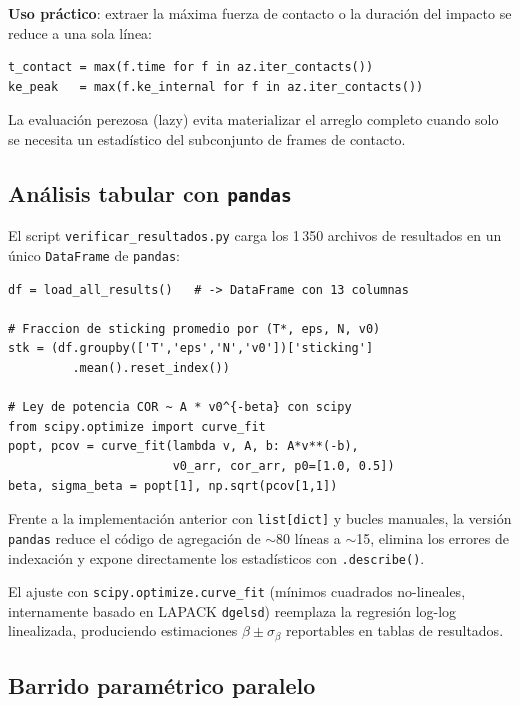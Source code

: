 \textbf{Uso práctico}: extraer la máxima fuerza de contacto o la duración
del impacto se reduce a una sola línea:
\begin{lstlisting}
t_contact = max(f.time for f in az.iter_contacts())
ke_peak   = max(f.ke_internal for f in az.iter_contacts())
\end{lstlisting}

La evaluación perezosa (lazy) evita materializar el arreglo completo cuando
solo se necesita un estadístico del subconjunto de frames de contacto.

\subsection{Análisis tabular con \texttt{pandas}}
\label{sec:pandas}

El script \verb|verificar_resultados.py| carga los 1\,350 archivos de resultados
en un único \verb|DataFrame| de \texttt{pandas}:

\begin{lstlisting}[caption={Carga masiva y operaciones de agregacion.}]
df = load_all_results()   # -> DataFrame con 13 columnas

# Fraccion de sticking promedio por (T*, eps, N, v0)
stk = (df.groupby(['T','eps','N','v0'])['sticking']
         .mean().reset_index())

# Ley de potencia COR ~ A * v0^{-beta} con scipy
from scipy.optimize import curve_fit
popt, pcov = curve_fit(lambda v, A, b: A*v**(-b),
                       v0_arr, cor_arr, p0=[1.0, 0.5])
beta, sigma_beta = popt[1], np.sqrt(pcov[1,1])
\end{lstlisting}

Frente a la implementación anterior con \verb|list[dict]| y bucles manuales, la
versión \texttt{pandas} reduce el código de agregación de $\sim$80 líneas a
$\sim$15, elimina los errores de indexación y expone directamente los
estadísticos con \verb|.describe()|.

El ajuste con \verb|scipy.optimize.curve_fit| (mínimos cuadrados no-lineales,
internamente basado en LAPACK \texttt{dgelsd}) reemplaza la regresión
log-log linealizada, produciendo estimaciones $\beta \pm \sigma_\beta$
reportables en tablas de resultados.

\subsection{Barrido paramétrico paralelo}
\label{sec:paralelo}

